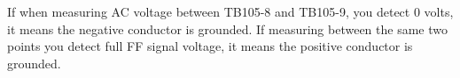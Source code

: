 \vskip 10pt

If when measuring AC voltage between TB105-8 and TB105-9, you detect 0 volts, it means the negative conductor is grounded.  If measuring between the same two points you detect full FF signal voltage, it means the positive conductor is grounded.










